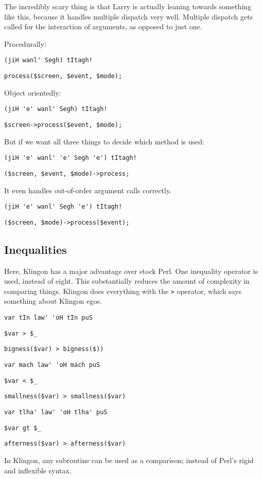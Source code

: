 \documentclass{article}
\begin{document}
The incredibly scary thing is that Larry is actually leaning towards
something like this, because it handles multiple dispatch very well.  
Multiple dispatch gets called for the interaction of arguments,
as opposed to just one.

\noindent Procedurally:

\verb"(jiH wanl' Segh) tItagh!"

\verb"process($screen, $event, $mode);"

\noindent Object orientedly:

\verb"(jiH 'e' wanl' Segh) tItagh!"

\verb"$screen->process($event, $mode);"

\noindent But if we want all three things to decide which method is
used:

\verb"(jiH 'e' wanl' 'e' Segh 'e') tItagh!"

\verb"($screen, $event, $mode)->process;"

\noindent It even handles out-of-order argument calls correctly.

\verb"(jiH 'e' wanl' Segh 'e') tItagh!"

\verb"($screen, $mode)->process($event);"

\subsection{Inequalities}
Here, Klingon has a major advantage over stock Perl.  
One inequality operator is used, instead of eight.  This substantially
reduces the amount of complexity in comparing things.
Klingon does everything with the \verb'>' operator, which says 
something about Klingon egos.

\verb"var tIn law' 'oH tIn puS"

\verb"$var > $_"

\verb"bigness($var) > bigness($))"

\null

\verb"var mach law' 'oH mach puS"

\verb"$var < $_"

\verb"smallness($var) > smallness($var)"

\null

\verb"var tlha' law' 'oH tlha' puS"

\verb"$var gt $_"

\verb"afterness($var) > afterness($var)"

\noindent In Klingon, any subroutine can be used as a comparison; instead 
of Perl's rigid and inflexible syntax.
\end{document}

